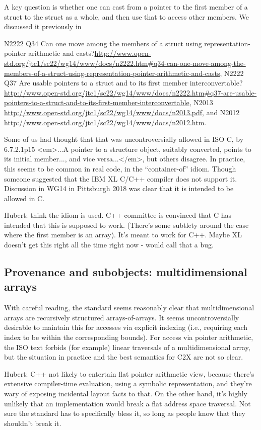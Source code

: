 \documentclass[acmsmall,review,screen]{acmart}\settopmatter{printfolios=true,printccs=false,printacmref=false}
\begin{document}
A key question is whether one can cast from a pointer to the first
member of a struct to the struct as a whole, and then use that to
access other members. We discussed it previously in 

N2222 Q34 Can one move among the members of a struct using representation-pointer arithmetic and casts?\url{http://www.open-std.org/jtc1/sc22/wg14/www/docs/n2222.htm#q34-can-one-move-among-the-members-of-a-struct-using-representation-pointer-arithmetic-and-casts},
N2222 Q37 Are usable pointers to a struct and to its first member
interconvertable? \url{http://www.open-std.org/jtc1/sc22/wg14/www/docs/n2222.htm#q37-are-usable-pointers-to-a-struct-and-to-its-first-member-interconvertable},
N2013 \url{http://www.open-std.org/jtc1/sc22/wg14/www/docs/n2013.pdf}, and
N2012 \url{http://www.open-std.org/jtc1/sc22/wg14/www/docs/n2012.htm}.

Some of us had thought that that was
uncontroversially allowed in ISO C, by 
6.7.2.1p15 <em>...A pointer to a
structure object, suitably converted, points to its initial
member..., and vice versa...</em>, but others disagree.
In practice, this seems to be common in real code, in the
``container-of'' idiom.   
Though someone suggested that the IBM XL C/C++ compiler does not
support it. 
Discussion in WG14 in Pittsburgh 2018 was clear that it is intended to
be allowed in C.


Hubert: think the idiom is used. C++ committee is convinced that C has
intended that this is supposed to work.  (There's some subtlety around
the case where the first member is an array).  It's meant to work for C++.
Maybe XL doesn't get this right all the time right now - would call that a bug.


\subsection{Provenance and subobjects: multidimensional arrays}

With careful reading, the standard seems reasonably clear that
multidimensional arrays are recursively structured arrays-of-arrays.
It seems uncontroversially desirable to maintain this for accesses via
explicit indexing (i.e., requiring each index to be within the
corresponding bounds).   For access via pointer arithmetic, the ISO
text forbids (for example) linear traversals of a multidimensional
array, but the situation in practice and the best semantics for C2X
are not so clear. 

Hubert: C++ not likely to entertain flat pointer arithmetic view,
because there's extensive compiler-time evaluation, using a symbolic
representation, and they're wary of exposing incidental layout facts
to that.  On the other hand, it's highly unlikely that an
implementation would break a flat address space traversal.  Not sure
the standard has to specifically bless it, so long as people know that
they shouldn't break it.
\end{document}
